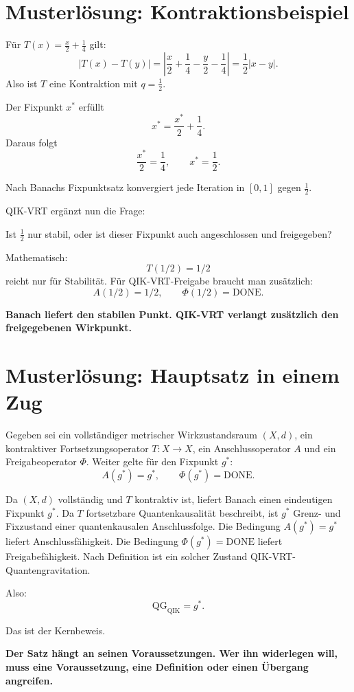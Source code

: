 \documentclass[11pt,a4paper,oneside]{scrartcl}
\theoremstyle{qikstyle}
\newcommand{\QIK}{\mathrm{QIK}}
\newcommand{\DONE}{\mathrm{DONE}}
\newcommand{\Phiop}{\Phi}
\newenvironment{merksatz}{\begin{center}\begin{minipage}{0.92\linewidth}\sffamily\bfseries}{\end{minipage}\end{center}}
\begin{document}
\section{Musterlösung: Kontraktionsbeispiel}

Für \(T(x)=\frac{x}{2}+\frac14\) gilt:
\[
|T(x)-T(y)|=\left|\frac{x}{2}+\frac14-\frac{y}{2}-\frac14\right|=\frac12|x-y|.
\]
Also ist \(T\) eine Kontraktion mit \(q=\frac12\).

Der Fixpunkt \(x^*\) erfüllt
\[
x^*=\frac{x^*}{2}+\frac14.
\]
Daraus folgt
\[
\frac{x^*}{2}=\frac14,
\qquad x^*=\frac12.
\]

Nach Banachs Fixpunktsatz konvergiert jede Iteration in \([0,1]\) gegen \(\frac12\).

QIK-VRT ergänzt nun die Frage:

Ist \(\frac12\) nur stabil, oder ist dieser Fixpunkt auch angeschlossen und freigegeben?

Mathematisch:
\[
T(1/2)=1/2
\]
reicht nur für Stabilität. Für QIK-VRT-Freigabe braucht man zusätzlich:
\[
A(1/2)=1/2,
\qquad \Phiop(1/2)=\DONE.
\]

\begin{merksatz}
Banach liefert den stabilen Punkt. QIK-VRT verlangt zusätzlich den freigegebenen Wirkpunkt.
\end{merksatz}
\newpage

\section{Musterlösung: Hauptsatz in einem Zug}

Gegeben sei ein vollständiger metrischer Wirkzustandsraum \((X,d)\), ein kontraktiver Fortsetzungsoperator \(T:X\to X\), ein Anschlussoperator \(A\) und ein Freigabeoperator \(\Phiop\). Weiter gelte für den Fixpunkt \(g^*\):
\[
A(g^*)=g^*,\qquad \Phiop(g^*)=\DONE.
\]

Da \((X,d)\) vollständig und \(T\) kontraktiv ist, liefert Banach einen eindeutigen Fixpunkt \(g^*\). Da \(T\) fortsetzbare Quantenkausalität beschreibt, ist \(g^*\) Grenz- und Fixzustand einer quantenkausalen Anschlussfolge. Die Bedingung \(A(g^*)=g^*\) liefert Anschlussfähigkeit. Die Bedingung \(\Phiop(g^*)=\DONE\) liefert Freigabefähigkeit. Nach Definition ist ein solcher Zustand QIK-VRT-Quantengravitation.

Also:
\[
\boxed{\mathrm{QG}_{\QIK}=g^*.}
\]

Das ist der Kernbeweis.

\begin{merksatz}
Der Satz hängt an seinen Voraussetzungen. Wer ihn widerlegen will, muss eine Voraussetzung, eine Definition oder einen Übergang angreifen.
\end{merksatz}
\newpage
\end{document}
